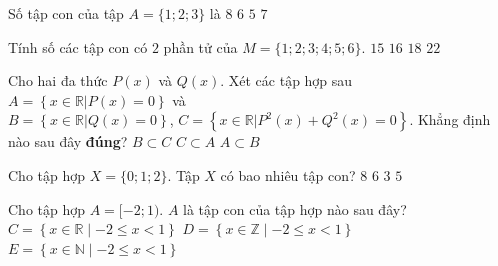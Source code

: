 \begin{ex}%
	Số tập con của  tập $A=\{ 1;2;3\}$ là
	\choice 
		{\True  $8$}
		 {$6$}
		 {$5$}
		{$7$} 
\end{ex}

\begin{ex}%
	Tính số các tập con có $2$ phần tử của  $M=\{1;2;3;4;5;6\}$.
	\choice 
		{\True  $15$}
		{$16$} 
		 {$18$}
		{$22$} 
\end{ex}

\begin{ex}%
	Cho hai đa thức $P(x)$ và $Q(x)$. Xét các tập hợp sau $A = \left\{x \in \mathbb{R}\big| P(x) = 0\right\}$ và \\ 
	$B = \left\{x \in \mathbb{R}\big| Q(x) = 0\right\}$, $C = \left\{x \in \mathbb{R}\big| P^2 (x) + Q^2 (x) = 0\right\}$. Khẳng định  nào sau đây \textbf{đúng}?
		{$B \subset  C$}
		{\True $C \subset  A$}
		{$A  \subset B$}
\end{ex}

\begin{ex}%
	Cho tập hợp $X=\{0;1;2\}$. Tập $X$ có bao nhiêu  tập con?
	 \choice
		{\True $8$} 
		{$6$} 
		{$3$} 
		{$5$} 
\end{ex}

\begin{ex}%
	Cho  tập hợp $A = [-2;1)$. $A$ là tập con của tập hợp nào sau đây?
	 \choice{$B=[-1;2)$}
		{\True $C = \left\{x \in \mathbb{R} \mid  -2 \le x < 1\right\} $}
		{$D= \left\{x \in \mathbb{Z} \mid -2 \le  x < 1\right\}$}
		 {$E= \left\{x \in \mathbb{N} \mid -2 \le x < 1\right\}$}
	\loigiai{ 
		$C = \left\{x \in  \mathbb{R} \mid -2 \le x < 1\right\} =[-2;1)$, suy ra $A\subset C$.
	 }
\end{ex}

